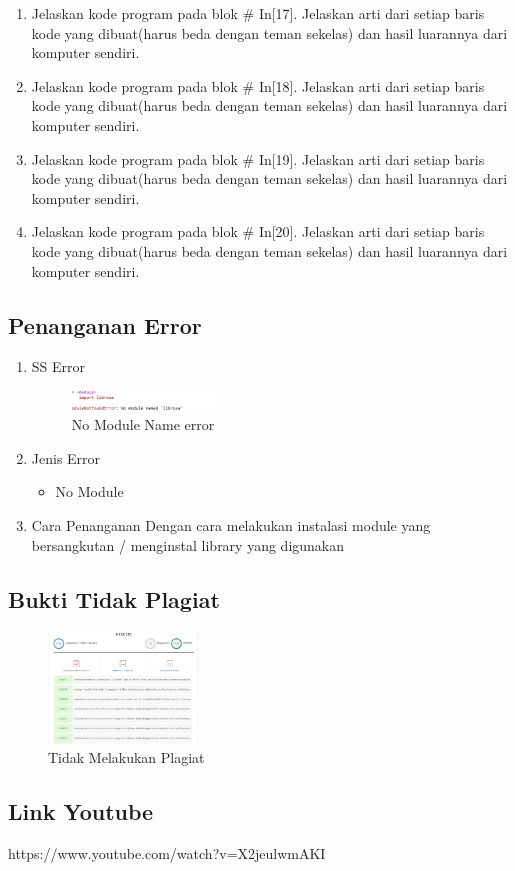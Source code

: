 \begin{enumerate}
\item Jelaskan kode program pada blok \# In[17]. Jelaskan arti dari setiap baris kode yang dibuat(harus beda dengan teman sekelas) dan hasil luarannya dari komputer sendiri.


\item Jelaskan kode program pada blok \# In[18]. Jelaskan arti dari setiap baris kode yang dibuat(harus beda dengan teman sekelas) dan hasil luarannya dari komputer sendiri.


\item Jelaskan kode program pada blok \# In[19]. Jelaskan arti dari setiap baris kode yang dibuat(harus beda dengan teman sekelas) dan hasil luarannya dari komputer sendiri.


\item Jelaskan kode program pada blok \# In[20]. Jelaskan arti dari setiap baris kode yang dibuat(harus beda dengan teman sekelas) dan hasil luarannya dari komputer sendiri.

\end{enumerate}
\subsection{Penanganan Error}
\begin{enumerate}
	\item SS Error
	\begin{figure}[H]
		\includegraphics[width=4cm]{figures/1174071/7/error.png}
		\centering
		\caption{No Module Name error}
	\end{figure}
	\item Jenis Error
	\begin{itemize}
		\item No Module
	\end{itemize}
	\item Cara Penanganan
	\hfill\break
	Dengan cara melakukan instalasi module yang bersangkutan / menginstal library yang digunakan
\end{enumerate}
\subsection{Bukti Tidak Plagiat}
\begin{figure}[H]
    \includegraphics[width=4cm]{figures/1174071/7/plagiarisme.PNG}
    \centering
    \caption{Tidak Melakukan Plagiat}
\end{figure}
\subsection{Link Youtube}
https://www.youtube.com/watch?v=X2jeulwmAKI